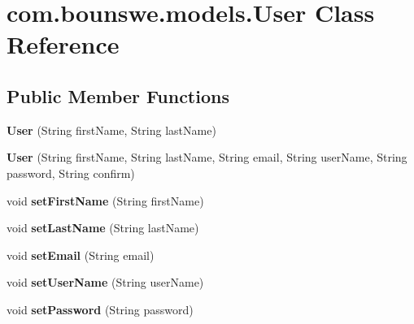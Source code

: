 \hypertarget{classcom_1_1bounswe_1_1models_1_1_user}{}\section{com.\+bounswe.\+models.\+User Class Reference}
\label{classcom_1_1bounswe_1_1models_1_1_user}
\subsection*{Public Member Functions}
\begin{DoxyCompactItemize}
\item 
\mbox{\label{classcom_1_1bounswe_1_1models_1_1_user_aee7dadb84168d4a5d533bb8eabe98c4d}} 
{\bfseries User} (String first\+Name, String last\+Name)
\item 
\mbox{\label{classcom_1_1bounswe_1_1models_1_1_user_a5c9f9c865044921959c2bc3d86fd362d}} 
{\bfseries User} (String first\+Name, String last\+Name, String email, String user\+Name, String password, String confirm)
\item 
\mbox{\label{classcom_1_1bounswe_1_1models_1_1_user_a9a68dfbda052827f9e1666fb1dd5f443}} 
void {\bfseries set\+First\+Name} (String first\+Name)
\item 
\mbox{\label{classcom_1_1bounswe_1_1models_1_1_user_ad192eeb80ebc0c49a07f4d506fc59234}} 
void {\bfseries set\+Last\+Name} (String last\+Name)
\item 
\mbox{\label{classcom_1_1bounswe_1_1models_1_1_user_a6e959594820aa26948d4b89250b3c853}} 
void {\bfseries set\+Email} (String email)
\item 
\mbox{\label{classcom_1_1bounswe_1_1models_1_1_user_a4179b291e71b8cd7cde2764fb6ebfbfc}} 
void {\bfseries set\+User\+Name} (String user\+Name)
\item 
\mbox{\label{classcom_1_1bounswe_1_1models_1_1_user_a47430116030529dfb875930050b609eb}} 
void {\bfseries set\+Password} (String password)

\end{DoxyCompactItemize}
